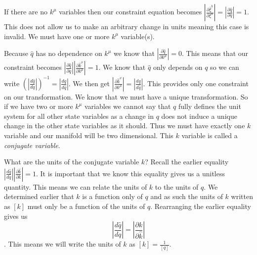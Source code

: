 \documentclass{article}[a4paper]
\begin{document}
	If there are no $k^\mu$ variables then our constraint equation becomes $\left|\frac{\partial\hat{\xi}^b}{\partial\xi^a}\right| = \left|\frac{\partial \hat{q}}{\partial q}\right| = 1$. This does not allow us to make an arbitrary change in units meaning this case is invalid. We must have one or more $k^\mu$ variable(s).

	Because $\hat{q}$ has no dependence on $k^\mu$ we know that $\left|\frac{\partial \hat{q}}{\partial k^\mu}\right| = 0$. This means that our constraint becomes $\left|\frac{\partial \hat{q}}{\partial q}\right|\left|\frac{\partial \hat{k}^\nu}{\partial k^\mu}\right| = 1$. We know that $\hat{q}$ only depends on $q$ so we can write $(\left|\frac{d \hat{q}}{d q}\right|)^{-1} = \left|\frac{d q}{d \hat{q}}\right|$. We then get $\left|\frac{\partial \hat{k}^\nu}{\partial k^\mu}\right| = \left|\frac{d q}{d \hat{q}}\right|$. This provides only one constraint on our transformation. We know that we must have a unique transformation. So if we have two or more $k^\mu$ variables we cannot say that $q$ fully defines the unit system for all other state variables as a change in $q$ does not induce a unique change in the other state variables as it should. Thus we must have exactly one $k$ variable and our manifold will be two dimensional. This $k$ variable is called a \textit{conjugate variable}.
	
	What are the units of the conjugate variable $k$? Recall the earlier equality $\left|\frac{d\hat{q}}{dq}\right|\left|\frac{\partial \hat{k}}{\partial k}\right| = 1$. It is important that we know this equality gives us a unitless quantity. This means we can relate the units of $k$ to the units of $q$. We determined earlier that $k$ is a function only of $q$ and as such the units of $k$ written as $[k]$ must only be a function of the units of $q$. Rearranging the earlier equality gives us $$\left|\frac{d\hat{q}}{dq}\right| = \left|\frac{\partial k}{\partial \hat{k}}\right|$$. This means we will write the units of $k$ as $[k] = \frac{1}{[q]}$.
	
\end{document}
